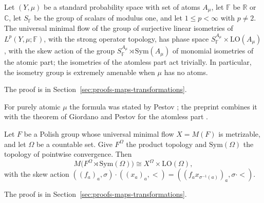 \begin{theorem}\label{thm:lupini-lp}
Let $(Y,\mu)$ be a standard probability space with set of atoms $A_\mu$, let
$\mathbb{F}$ be $\mathbb{R}$ or $\mathbb{C}$, let $S_{\mathbb{F}}$ be the
group of scalars of modulus one, and let $1\leq p<\infty$ with $p\neq2$. The
universal minimal flow of the group of surjective linear isometries of
$L^p(Y,\mu;\mathbb{F})$, with the strong operator topology, has phase space
$S_{\mathbb{F}}^{A_\mu}\times\mathrm{LO}(A_\mu)$, with the skew action of the
group $S_{\mathbb{F}}^{A_\mu}\rtimes\mathrm{Sym}(A_\mu)$ of monomial
isometries of the atomic part; the isometries of the atomless part act
trivially.
In particular, the isometry group is extremely amenable when $\mu$ has no
atoms.
\end{theorem}

The proof is in Section~\ref{sec:proofs-maps-transformations}.

\begin{remark}\label{rem:lupini-lp}
For purely atomic $\mu$ the formula was stated by Pestov
\cite[Theorem~4.13 and Remark~4.14]{PestovRemarks2002}; the preprint combines it
with the theorem of Giordano and Pestov for the atomless part
\cite{LupiniPointwise2026}.
\end{remark}

\begin{theorem}\label{thm:lupini-wreath}
Let $F$ be a Polish group whose universal minimal flow $X=M(F)$ is
metrizable, and let $\Omega$ be a countable set. Give $F^\Omega$ the product
topology and $\mathrm{Sym}(\Omega)$ the topology of pointwise convergence.
Then
\[
M\bigl(F^\Omega\rtimes\mathrm{Sym}(\Omega)\bigr)\cong X^\Omega\times\mathrm{LO}(\Omega),
\]
with the skew action
$((f_a)_a,\sigma)\cdot((x_a)_a,<)=((f_a x_{\sigma^{-1}(a)})_a,\sigma\cdot{<})$.
\end{theorem}

The proof is in Section~\ref{sec:proofs-maps-transformations}.

